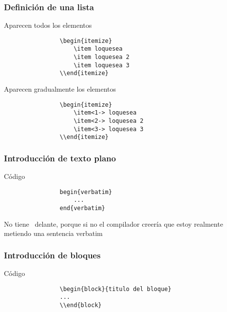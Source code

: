 \documentclass{beamer}
\begin{document}
	\begin{frame}[fragile]
		\frametitle{Definición de una lista}
		\begin{block}{Aparecen todos los elementos}
			\begin{verbatim}
				\begin{itemize}
					\item loquesea
					\item loquesea 2
					\item loquesea 3
				\\end{itemize}
			\end{verbatim}
		\end{block}
		\begin{block}{Aparecen gradualmente los elementos}
			\begin{verbatim}
				\begin{itemize}
					\item<1-> loquesea
					\item<2-> loquesea 2
					\item<3-> loquesea 3
				\\end{itemize}
			\end{verbatim}
		\end{block}
	\end{frame}
	
	\begin{frame}[fragile]
		\frametitle{Introducción de texto plano}
		\begin{block}{Código}
			\begin{verbatim}
				begin{verbatim}
					...
				end{verbatim}
			\end{verbatim}
			\alert{No tiene \ delante, porque si no el compilador creería que estoy realmente metiendo una sentencia verbatim}
		\end{block}
	\end{frame}
	
	\begin{frame}[fragile]
		\frametitle{Introducción de bloques}
		\begin{block}{Código}
			\begin{verbatim}
				\begin{block}{titulo del bloque}
				...
				\\end{block}
			\end{verbatim}
		\end{block}
	\end{frame}
	
\end{document}
